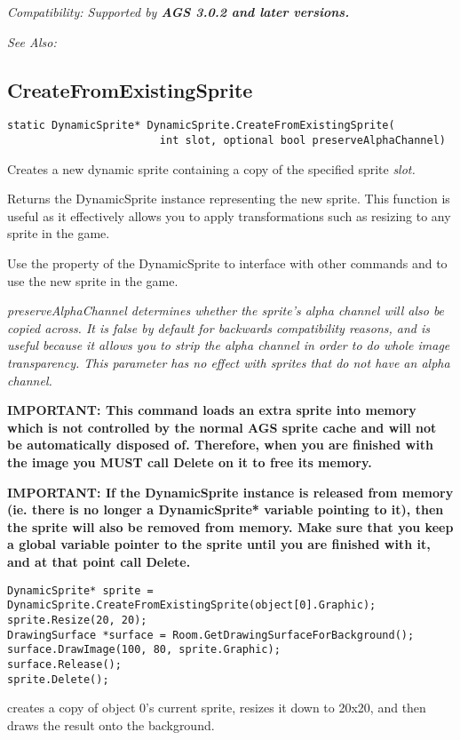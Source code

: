 \it{Compatibility:} Supported by \bf{AGS 3.0.2} and later versions.

\it{See Also:} 


\subsection{CreateFromExistingSprite}\label{DynamicSprite.CreateFromExistingSprite}%

\begin{verbatim}
static DynamicSprite* DynamicSprite.CreateFromExistingSprite(
                        int slot, optional bool preserveAlphaChannel)
\end{verbatim}
Creates a new dynamic sprite containing a copy of the specified sprite \it{slot}.

Returns the DynamicSprite instance representing the new sprite. This function
is useful as it effectively allows you to apply transformations such as resizing to
any sprite in the game.

Use the  property of the DynamicSprite to
interface with other commands and to use the new sprite in the game.

\it{preserveAlphaChannel} determines whether the sprite's alpha channel will also
be copied across. It is false by default for backwards compatibility reasons, and
is useful because it allows you to strip the alpha channel in order to do whole image
transparency. This parameter has no effect with sprites that do not have an alpha
channel.

\bf{IMPORTANT:} This command loads an extra sprite into memory which is not controlled
by the normal AGS sprite cache and will not be automatically disposed of. Therefore, when
you are finished with the image you \bf{MUST} call Delete on it to free its memory.

\bf{IMPORTANT:} If the DynamicSprite instance is released from memory (ie. there is
no longer a DynamicSprite* variable pointing to it), then the sprite will also be
removed from memory. Make sure that you keep a global variable pointer to the sprite
until you are finished with it, and at that point call Delete.

\begin{verbatim}
DynamicSprite* sprite = DynamicSprite.CreateFromExistingSprite(object[0].Graphic);
sprite.Resize(20, 20);
DrawingSurface *surface = Room.GetDrawingSurfaceForBackground();
surface.DrawImage(100, 80, sprite.Graphic);
surface.Release();
sprite.Delete();
\end{verbatim}
creates a copy of object 0's current sprite, resizes it down to 20x20, and then draws
the result onto the background.

